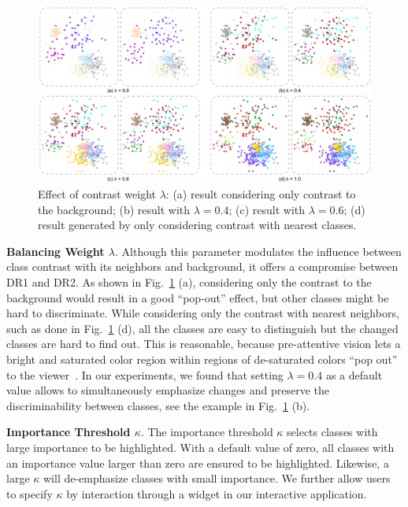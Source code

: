 \begin{figure}[!htb]
\centering
\includegraphics[width=1.0\textwidth]{figures/lambda.pdf}
\caption{Effect of contrast weight $\lambda$: (a) result  considering only contrast to the background; (b) result with $\lambda=0.4$; (c) result with $\lambda=0.6$; (d) result generated by only considering contrast with nearest classes. }
\vspace*{-3mm}
\label{fig:lambda}
\end{figure}

\noindent\textbf{Balancing Weight $\lambda$}.
Although this parameter modulates the influence between class contrast with its neighbors and  background, it offers a compromise between DR1 and DR2.
As shown in Fig.~\ref{fig:lambda} (a), considering only the contrast to the background would result in a good ``pop-out'' effect, but other classes might be hard to discriminate. While considering only the contrast with nearest neighbors, such as done in Fig.~\ref{fig:lambda} (d), all the classes are easy to distinguish but the changed classes are hard to find out.
This is reasonable, because pre-attentive vision
lets a bright and saturated color region within regions of de-saturated colors ``pop out'' to the viewer~\cite{healey1995visualizing}.
In our experiments, we found that setting  $\lambda=0.4$ as a default value allows to simultaneously emphasize changes and preserve the discriminability between classes, see the  example in Fig.~\ref{fig:lambda} (b).

\vspace{1.5mm}
\noindent\textbf{Importance Threshold $\kappa$}.
The importance threshold $\kappa$ selects classes with large importance to be highlighted.
With a default value of zero, all classes with an importance value larger than zero are ensured to be highlighted. Likewise, a large $\kappa$ will de-emphasize classes with small importance.
We further allow users to specify $\kappa$ by interaction through a widget in our interactive application. %

